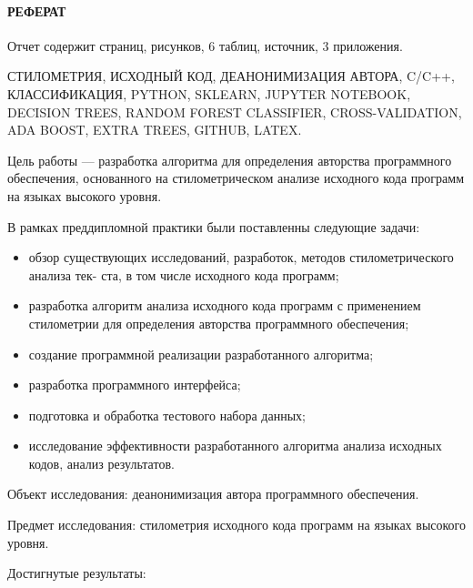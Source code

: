 \newpage
{}
\paragraph{\hfill РЕФЕРАТ \hfill}
Отчет содержит  страниц,  рисунков, 6 таблиц,  источник, 3 приложения.


СТИЛОМЕТРИЯ, ИСХОДНЫЙ КОД, ДЕАНОНИМИЗАЦИЯ АВТОРА, C/C++, КЛАССИФИКАЦИЯ, PYTHON, SKLEARN, JUPYTER NOTEBOOK, DECISION
TREES, RANDOM FOREST CLASSIFIER, CROSS-VALIDATION, ADA BOOST, EXTRA TREES, GITHUB, LATEX.

Цель работы --- разработка алгоритма для определения авторства программного обеспечения, основанного на стилометрическом анализе исходного кода программ на языках высокого уровня.

В рамках преддипломной практики были поставленны следующие задачи: 
\begin{itemize}
  \item обзор существующих исследований, разработок, методов стилометрического анализа тек-
ста, в том числе исходного кода программ;
  \item разработка алгоритм анализа исходного кода программ с применением стилометрии для
определения авторства программного обеспечения;
  \item создание программной реализации разработанного алгоритма;
  \item разработка программного интерфейса;
  \item подготовка и обработка тестового набора данных;
  \item исследование эффективности разработанного алгоритма анализа исходных кодов, анализ результатов.
\end{itemize}

Объект исследования: деанонимизация автора программного обеспечения. 

Предмет исследования: стилометрия исходного кода программ на языках высокого уровня.

Достигнутые результаты:

